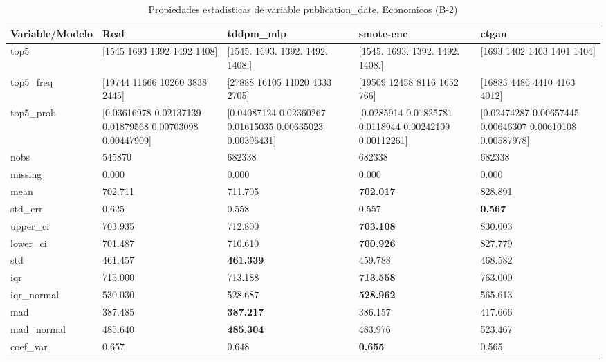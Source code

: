 \begin{table}[H]
\centering
\fontsize{8}{14}\selectfont
\caption{Propiedades  estadisticas de variable publication\_date, Economicos (B-2)}
\label{table-stats-economicos-b-2-publication_date}
\begin{tabular}{|l|m{10em}|m{10em}|m{10em}|m{10em}|}
\hline
 \rowcolor[gray]{0.8}
Variable/Modelo & Real & tddpm\_mlp & smote-enc & ctgan \\
\hline top5 & [1545 1693 1392 1492 1408] & [1545. 1693. 1392. 1492. 1408.] & [1545. 1693. 1392. 1492. 1408.] & [1693 1402 1403 1401 1404] \\
\hline top5\_freq & [19744 11666 10260  3838  2445] & [27888 16105 11020  4333  2705] & [19509 12458  8116  1652   766] & [16883  4486  4410  4163  4012] \\
\hline top5\_prob & [0.03616978 0.02137139 0.01879568 0.00703098 0.00447909] & [0.04087124 0.02360267 0.01615035 0.00635023 0.00396431] & [0.0285914  0.01825781 0.0118944  0.00242109 0.00112261] & [0.02474287 0.00657445 0.00646307 0.00610108 0.00587978] \\
\hline nobs & 545870 & 682338 & 682338 & 682338 \\
\hline missing & 0.000 & 0.000 & 0.000 & 0.000 \\
\hline mean & 702.711 & 711.705 & \bfseries 702.017 & \cellcolor[rgb]{0.9, 0.54, 0.52} 828.891 \\
\hline std\_err & 0.625 & 0.558 & \cellcolor[rgb]{0.9, 0.54, 0.52} 0.557 & \bfseries 0.567 \\
\hline upper\_ci & 703.935 & 712.800 & \bfseries 703.108 & \cellcolor[rgb]{0.9, 0.54, 0.52} 830.003 \\
\hline lower\_ci & 701.487 & 710.610 & \bfseries 700.926 & \cellcolor[rgb]{0.9, 0.54, 0.52} 827.779 \\
\hline std & 461.457 & \bfseries 461.339 & 459.788 & \cellcolor[rgb]{0.9, 0.54, 0.52} 468.582 \\
\hline iqr & 715.000 & 713.188 & \bfseries 713.558 & \cellcolor[rgb]{0.9, 0.54, 0.52} 763.000 \\
\hline iqr\_normal & 530.030 & 528.687 & \bfseries 528.962 & \cellcolor[rgb]{0.9, 0.54, 0.52} 565.613 \\
\hline mad & 387.485 & \bfseries 387.217 & 386.157 & \cellcolor[rgb]{0.9, 0.54, 0.52} 417.666 \\
\hline mad\_normal & 485.640 & \bfseries 485.304 & 483.976 & \cellcolor[rgb]{0.9, 0.54, 0.52} 523.467 \\
\hline coef\_var & 0.657 & 0.648 & \bfseries 0.655 & \cellcolor[rgb]{0.9, 0.54, 0.52} 0.565 \\

\end{tabular}
\end{table}
